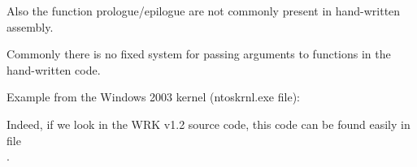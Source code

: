 Also the function prologue/epilogue are not commonly present in hand-written assembly.
\par

Commonly there is no fixed system for passing arguments to functions in the hand-written code.

\par
Example from the Windows 2003 kernel 
(ntoskrnl.exe file):



Indeed, if we look in the 
\ac{WRK} v1.2 source code, this code
can be found easily in file \\
.
